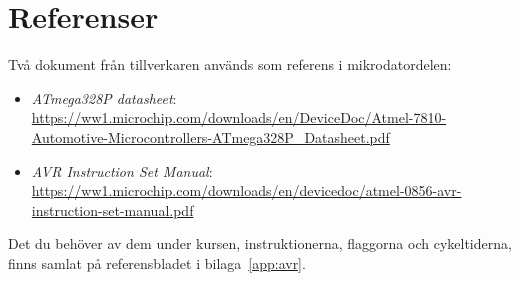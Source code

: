 \section*{Referenser}
Två dokument från tillverkaren används som referens i mikrodatordelen:
\begin{itemize}
  \item \emph{ATmega328P datasheet}:
    \url{https://ww1.microchip.com/downloads/en/DeviceDoc/Atmel-7810-Automotive-Microcontrollers-ATmega328P_Datasheet.pdf}
  \item \emph{AVR Instruction Set Manual}:
    \url{https://ww1.microchip.com/downloads/en/devicedoc/atmel-0856-avr-instruction-set-manual.pdf}
\end{itemize}
Det du behöver av dem under kursen, instruktionerna, flaggorna och cykeltiderna, finns samlat på
referensbladet i bilaga~\ref{app:avr}.

